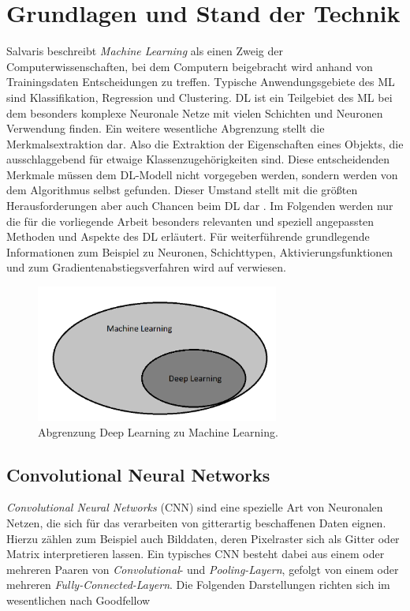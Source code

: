 \section{Grundlagen und Stand der Technik}

Salvaris beschreibt \textit{Machine Learning} als einen Zweig der Computerwissenschaften, bei dem Computern beigebracht wird anhand von Trainingsdaten Entscheidungen zu treffen. Typische Anwendungsgebiete des ML sind Klassifikation, Regression und Clustering. DL ist ein Teilgebiet des ML bei dem besonders komplexe Neuronale Netze mit vielen Schichten und Neuronen Verwendung finden. Ein weitere wesentliche Abgrenzung stellt die Merkmalsextraktion dar. Also die Extraktion der Eigenschaften eines Objekts, die ausschlaggebend für etwaige Klassenzugehörigkeiten sind. Diese entscheidenden Merkmale müssen dem DL-Modell nicht vorgegeben werden, sondern werden von dem Algorithmus selbst gefunden. Dieser Umstand stellt mit die größten Herausforderungen aber auch Chancen beim DL dar \cite[S.32-47]{dlazure2019}.  Im Folgenden werden nur die für die vorliegende Arbeit besonders relevanten und speziell angepassten Methoden und Aspekte des DL erläutert. Für weiterführende grundlegende Informationen zum Beispiel zu Neuronen, Schichttypen, Aktivierungsfunktionen und zum Gradientenabstiegsverfahren wird auf \cite{dlbook2018} verwiesen. 
\begin{figure}[!h]\label{dlmlunterschied}
  \centering
  \includegraphics[width=8cm]{mldlunterschied.png}
  \caption{Abgrenzung Deep Learning zu Machine Learning.}
\end{figure}

\subsection{Convolutional Neural Networks}

\textit{Convolutional Neural Networks} (CNN) sind eine spezielle Art von Neuronalen Netzen, die sich für das verarbeiten von gitterartig beschaffenen Daten eignen. Hierzu zählen zum Beispiel auch Bilddaten, deren Pixelraster sich als Gitter oder Matrix interpretieren lassen. Ein typisches CNN besteht dabei aus einem oder mehreren Paaren von \textit{Convolutional}- und \textit{Pooling-Layern}, gefolgt von einem oder mehreren \textit{Fully-Connected-Layern}. Die Folgenden Darstellungen richten sich im wesentlichen nach Goodfellow \cite[S.326-366]{Goodfellow-et-al-2016}
